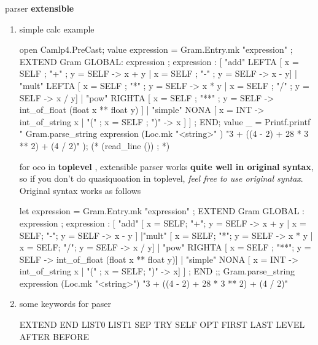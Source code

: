 \item parser \textbf{ extensible}
  \begin{enumerate}
  \item simple calc example 

    \begin{bluecode}
open Camlp4.PreCast; 
value expression = Gram.Entry.mk "expression" ; 
EXTEND Gram 
  GLOBAL: expression ; 
  expression : [
     "add" LEFTA 
   [ x = SELF ; "+" ; y = SELF ->  x +  y 
   | x = SELF ; "-" ; y = SELF ->  x -  y]
  | "mult" LEFTA 
   [ x = SELF ; "*" ; y = SELF -> x * y
   | x = SELF ; "/" ; y = SELF -> x / y]
  | "pow" RIGHTA 
   [ x = SELF ; "**" ; y = SELF -> int_of_float (float x ** float y) ]
  | "simple" NONA 
   [ x = INT -> int_of_string x 
   | "(" ; x = SELF ; ")" -> x ]   
  ] ; 
END;
value _ = Printf.printf "%
  Gram.parse_string 
    expression 
    (Loc.mk "<string>" ) "3 +  ((4 - 2) + 28 * 3 ** 2) + (4 / 2)" );
    (* (read_line ()) ;  *)
  \end{bluecode}
  



for oco in \textbf{ toplevel }, extensible parser works \textbf{
    quite well in original syntax}, so if you don't do quasiquoation
  in toplevel, \textit{feel free to use original syntax}.
  Original syntax works as follows 
\begin{bluecode}
let expression = Gram.Entry.mk "expression" ;
EXTEND Gram 
    GLOBAL : expression ;
    expression : [
    "add"
    [ x = SELF; "+"; y = SELF -> x + y
    | x = SELF; "-"; y = SELF -> x - y ]  
    |"mult"
    [ x = SELF; "*"; y = SELF -> x * y 
    | x = SELF; "/"; y = SELF -> x / y] 
    | "pow" RIGHTA
    [ x = SELF ; "**"; y = SELF -> int_of_float (float x ** float y)]
    | "simple" NONA 
    [ x = INT -> int_of_string x 
    |  "(" ;  x = SELF; ")" -> x]
    ] ; 
  END ;;
Gram.parse_string
   expression
   (Loc.mk "<string>")
   "3 +  ((4 - 2) + 28 * 3 ** 2) + (4 / 2)"
\end{bluecode}

\item some keywords for paser

  \begin{bluecode}
    EXTEND END  LIST0 LIST1 SEP TRY SELF OPT  FIRST LAST  LEVEL AFTER BEFORE
  \end{bluecode}


\end{enumerate}
